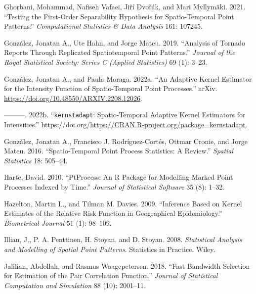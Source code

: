 \begin{CSLReferences}{1}{0}
\leavevmode{}%
Ghorbani, Mohammad, Nafiseh Vafaei, Jiří Dvořák, and Mari Myllymäki. 2021. {``Testing the First-Order Separability Hypothesis for Spatio-Temporal Point Patterns.''} \emph{Computational Statistics \& Data Analysis} 161: 107245.

\leavevmode{}%
González, Jonatan A., Ute Hahn, and Jorge Mateu. 2019. {``Analysis of Tornado Reports Through Replicated Spatiotemporal Point Patterns.''} \emph{Journal of the Royal Statistical Society: Series C (Applied Statistics)} 69 (1): 3--23.

\leavevmode{}%
González, Jonatan A., and Paula Moraga. 2022a. {``An Adaptive Kernel Estimator for the Intensity Function of Spatio-Temporal Point Processes.''} arXiv. \url{https://doi.org/10.48550/ARXIV.2208.12026}.

\leavevmode{}%
---------. 2022b. {``\texttt{kernstadapt}: Spatio-Temporal Adaptive Kernel Estimators for Intensities.''} https://doi.org/\url{https://CRAN.R-project.org/package=kernstadapt}.

\leavevmode{}%
González, Jonatan A., Francisco J. Rodríguez-Cortés, Ottmar Cronie, and Jorge Mateu. 2016. {``Spatio-Temporal Point Process Statistics: A Review.''} \emph{Spatial Statistics} 18: 505--44.

\leavevmode{}%
Harte, David. 2010. {``{PtProcess}: An {R} Package for Modelling Marked Point Processes Indexed by Time.''} \emph{Journal of Statistical Software} 35 (8): 1--32.

\leavevmode{}%
Hazelton, Martin L., and Tilman M. Davies. 2009. {``Inference Based on Kernel Estimates of the Relative Risk Function in Geographical Epidemiology.''} \emph{Biometrical Journal} 51 (1): 98--109.

\leavevmode{}%
Illian, J., P. A. Penttinen, H. Stoyan, and D. Stoyan. 2008. \emph{Statistical Analysis and Modelling of Spatial Point Patterns}. Statistics in Practice. Wiley.

\leavevmode{}%
Jalilian, Abdollah, and Rasmus Waagepetersen. 2018. {``Fast Bandwidth Selection for Estimation of the Pair Correlation Function.''} \emph{Journal of Statistical Computation and Simulation} 88 (10): 2001--11.


\end{CSLReferences}
